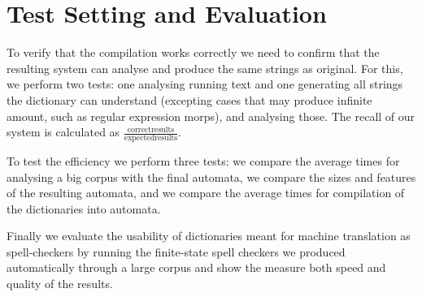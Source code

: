 \documentclass[11pt,a4paper]{article}
\begin{document}
\section{Test Setting and Evaluation}

To verify that the compilation works correctly we need to confirm that the
resulting system can analyse and produce the same strings as original. For
this, we perform two tests: one analysing running text and one generating all
strings the dictionary can understand (excepting cases that may produce
infinite amount, such as regular expression morps), and analysing those. The
recall of our system is calculated as $\frac{\mathrm{correct
results}}{\mathrm{expected results}}$.

To test the efficiency we perform three tests: we compare the average times for
analysing a big corpus with the final automata, we compare the sizes and
features of the resulting automata, and we compare the average times for
compilation of the dictionaries into automata.

Finally we evaluate the usability of dictionaries meant for machine translation
as spell-checkers by running the finite-state spell checkers we produced
automatically through a large corpus and show the measure both speed and
quality of the results.





\end{document}
